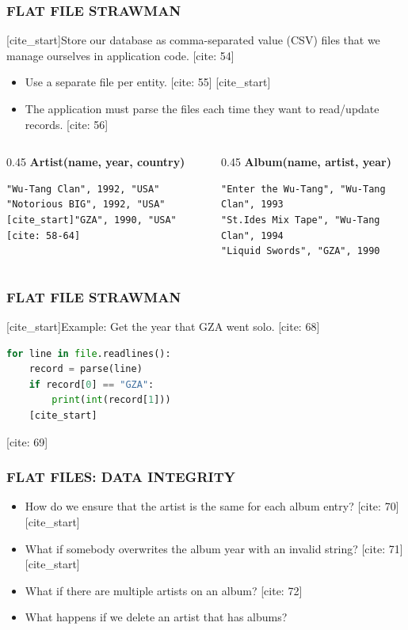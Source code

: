 \documentclass[aspectratio=169]{beamer}
\begin{document}
\begin{frame}[fragile]
    \frametitle{FLAT FILE STRAWMAN}
    [cite_start]Store our database as comma-separated value (CSV) files that we manage ourselves in application code. [cite: 54]
    \begin{itemize}
        [cite_start]\item Use a separate file per entity. [cite: 55]
        [cite_start]\item The application must parse the files each time they want to read/update records. [cite: 56]
    \end{itemize}
    \vspace{1em}
    \begin{columns}
        \begin{column}{0.45\textwidth}
            \textbf{Artist(name, year, country)}
            \begin{verbatim}
"Wu-Tang Clan", 1992, "USA"
"Notorious BIG", 1992, "USA"
[cite_start]"GZA", 1990, "USA" [cite: 58-64]
            \end{verbatim}
        \end{column}
        \begin{column}{0.45\textwidth}
            \textbf{Album(name, artist, year)}
            \begin{verbatim}
"Enter the Wu-Tang", "Wu-Tang Clan", 1993
"St.Ides Mix Tape", "Wu-Tang Clan", 1994
"Liquid Swords", "GZA", 1990
            \end{verbatim}
        \end{column}
    \end{columns}
\end{frame}

\begin{frame}[fragile]
    \frametitle{FLAT FILE STRAWMAN}
    [cite_start]Example: Get the year that GZA went solo. [cite: 68]
    \vspace{1em}
    \begin{lstlisting}[language=Python]
for line in file.readlines():
    record = parse(line)
    if record[0] == "GZA":
        print(int(record[1]))
    [cite_start]\end{lstlisting} [cite: 69]
\end{frame}

\begin{frame}
    \frametitle{FLAT FILES: DATA INTEGRITY}
    \begin{itemize}
        [cite_start]\item How do we ensure that the artist is the same for each album entry? [cite: 70]
        [cite_start]\item What if somebody overwrites the album year with an invalid string? [cite: 71]
        [cite_start]\item What if there are multiple artists on an album? [cite: 72]
        \item What happens if we delete an artist that has albums?
    \end{itemize}
\end{frame}
\end{document}
